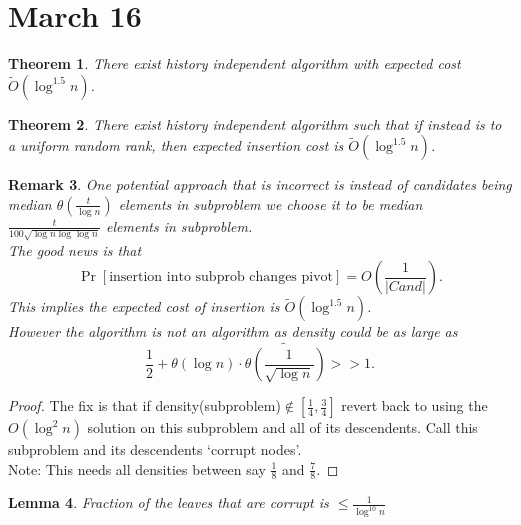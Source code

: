 \documentclass[a4paper]{article}
\newtheorem{thm}{Theorem}[section]
\newtheorem{lem}[thm]{Lemma}
\newtheorem{rmk}[thm]{Remark}
\begin{document}
\section{March 16}
\begin{thm}
    There exist history independent algorithm with expected cost $\tilde{O}\left (\log^{1.5} n \right )$. 
\end{thm}
\begin{thm}
    There exist history independent algorithm such that if instead is to a uniform random rank, then expected insertion cost is $\tilde{O}(\log^{1.5} n)$. 
\end{thm}
\begin{rmk}
    One potential approach that is incorrect is instead of candidates being median $\theta( \frac{t}{\log n})$ elements in subproblem we choose it to be median $\frac{t}{100 \sqrt{\log n \log \log n}}$ elements in subproblem. \\
    The good news is that 
    \[
    \Pr[ \text{insertion into subprob changes pivot}]= O \left( \frac{1}{|Cand|} \right)
    .\] 
    This implies the expected cost of insertion is $\tilde{O} \left( \log^{1.5} n \right)$. \\
    However the algorithm is not an algorithm as density could be as large as 
    \[
    \frac{1}{2}+\theta(\log n)\cdot \tilde{\theta \left( \frac{1}{\sqrt{\log n}} \right)}>>1
    .\] 
\end{rmk}
\begin{proof}
    The fix is that if density(subproblem)$\notin [\frac{1}{4}, \frac{3}{4}]$ revert back to using the $O(\log ^2 n)$ solution on this subproblem and all of its descendents. Call this subproblem and its descendents `corrupt nodes'. \\
    Note: This needs all densities between say $\frac{1}{8}$ and $\frac{7}{8}$.
\end{proof}
\begin{lem}
    Fraction of the leaves that are corrupt is $\leq \frac{1}{\log^10 n}$
\end{lem}
\end{document}
